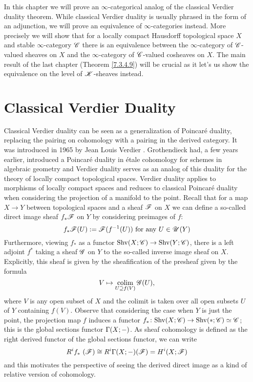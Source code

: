 \documentclass[../../thesis.tex]{subfiles}
\begin{document}
In this chapter we will prove an $\infty$-categorical analog of the classical Verdier duality theorem.
While classical Verdier duality is usually phrased in the form of an adjunction, we will prove an equivalence of $\infty$-categories instead.
More precisely we will show that for a locally compact Hausdorff topological space $X$ and stable $\infty$-category $\mathscr{C}$ there is an equivalence between the $\infty$-category of $\mathscr{C}$-valued sheaves on $X$ and the $\infty$-category of $\mathscr{C}$-valued cosheaves on $X$.
The main result of the last chapter (Theorem \ref{7.3.4.9}) will be crucial as it let's us show the equivalence on the level of $\mathscr{K}$-sheaves instead.
\section{Classical Verdier Duality}
Classical Verdier duality can be seen as a generalization of Poincaré duality, replacing the pairing on cohomology with a pairing in the derived category.
It was introduced in 1965 by Jean Louis Verdier \cite{Verdier95}.
Grothendieck had, a few years earlier, introduced a Poincaré duality in étale cohomology for schemes in algebraic geometry and Verdier duality serves as an analog of this duality for the theory of locally compact topological spaces.
Verdier duality applies to morphisms of locally compact spaces and reduces to classical Poincaré duality when considering the projection of a manifold to the point.
Recall that for a map $X \to Y$ between topological spaces and a sheaf $\mathscr{F}$ on $X$ we can define a so-called direct image sheaf $f_*\mathscr{F}$ on $Y$ by considering preimages of $f$:
\[
    f_*\mathscr{F}(U) : = \mathscr{F}(f^{-1}(U)) \text{ for any }  U \in \mathscr{U}(Y)
\]
Furthermore, viewing $f_*$ as a functor $\mathrm{Shv}(X;\mathscr{C}) \to \mathrm{Shv}(Y; \mathscr{C})$, there is a left adjoint $f^*$ taking a sheaf $\mathscr{G}$ on $Y$ to the so-called inverse image sheaf on $X$.
Explicitly, this sheaf is given by the sheafification of the presheaf given by the formula
\[
    V \mapsto \operatorname*{colim}_{U \supseteq f(V)}\mathscr{G}(U),
\]
where $V$ is any open subset of $X$ and the colimit is taken over all open subsets $U$ of $Y$ containing $f(V)$.
Observe that considering the case when $Y$ is just the point, the projection map $f$ induces a functor $f_* \colon \mathrm{Shv}(X;\mathscr{C}) \to \mathrm{Shv}(*; \mathscr{C}) \simeq \mathscr{C}$; this is the global sections functor $\Gamma(X; {-})$.
As sheaf cohomology is defined as the right derived functor of the global sections functor, we can write
\[
    R^i f_* (\F) \cong R^i\Gamma(X;\blank)(\F) = H^i(X; \F)
\]
and this motivates the perspective of seeing the derived direct image as a kind of relative version of cohomology.
\end{document}

